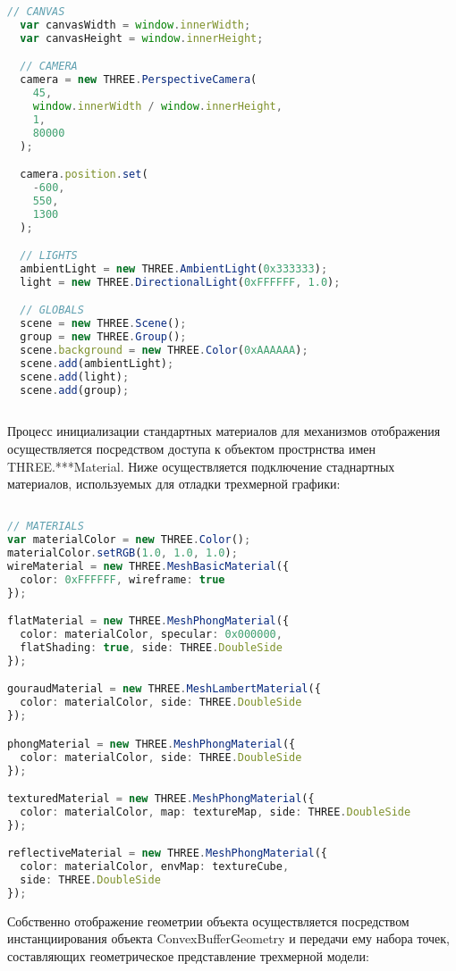 \begin{lstlisting}[language=TypeScript, label=lst:dev:setup]
  // CANVAS
  var canvasWidth = window.innerWidth;
  var canvasHeight = window.innerHeight;

  // CAMERA
  camera = new THREE.PerspectiveCamera(
    45,
    window.innerWidth / window.innerHeight,
    1,
    80000
  );

  camera.position.set(
    -600,
    550,
    1300
  );

  // LIGHTS
  ambientLight = new THREE.AmbientLight(0x333333);
  light = new THREE.DirectionalLight(0xFFFFFF, 1.0);

  // GLOBALS
  scene = new THREE.Scene();
  group = new THREE.Group();
  scene.background = new THREE.Color(0xAAAAAA);
  scene.add(ambientLight);
  scene.add(light);
  scene.add(group);
  
\end{lstlisting}

Процесс инициализации стандартных материалов для механизмов отображения осуществляется посредством доступа к объектом прострнства имен THREE.***Material. Ниже осуществляется подключение
стаднартных материалов, используемых для отладки трехмерной графики:

\begin{lstlisting}[language=TypeScript, label=lst:dev:mat]

// MATERIALS
var materialColor = new THREE.Color();
materialColor.setRGB(1.0, 1.0, 1.0);
wireMaterial = new THREE.MeshBasicMaterial({
  color: 0xFFFFFF, wireframe: true
});

flatMaterial = new THREE.MeshPhongMaterial({
  color: materialColor, specular: 0x000000,
  flatShading: true, side: THREE.DoubleSide
});

gouraudMaterial = new THREE.MeshLambertMaterial({
  color: materialColor, side: THREE.DoubleSide 
});

phongMaterial = new THREE.MeshPhongMaterial({
  color: materialColor, side: THREE.DoubleSide 
});

texturedMaterial = new THREE.MeshPhongMaterial({
  color: materialColor, map: textureMap, side: THREE.DoubleSide 
});

reflectiveMaterial = new THREE.MeshPhongMaterial({
  color: materialColor, envMap: textureCube,
  side: THREE.DoubleSide
});

\end{lstlisting}

Собственно отображение геометрии объекта осуществляется посредством инстанциирования объекта ConvexBufferGeometry
и передачи ему набора точек, составляющих геометрическое представление трехмерной модели:

